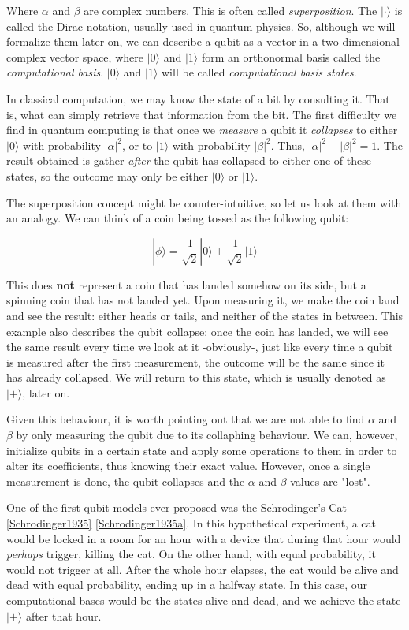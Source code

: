 Where $\alpha$ and $\beta$ are complex numbers. This is often called \emph{superposition}. The $| \cdot \rangle$ is called the Dirac notation, usually used in quantum physics. So, although we will formalize them later on, we can describe a qubit as a vector in a two-dimensional complex vector space, where $|0\rangle$ and $|1\rangle$ form an orthonormal basis called the \emph{computational basis}. $|0\rangle$ and $|1\rangle$ will be called \emph{computational basis states}.

In classical computation, we may know the state of a bit by consulting it. That is, what can simply retrieve that information from the bit. The first difficulty we find in quantum computing is that once we \emph{measure} a qubit it \emph{collapses} to either $|0\rangle$ with probability $|\alpha|^2$, or to $|1\rangle$ with probability $|\beta|^2$. Thus, $|\alpha|^2 + |\beta|^2 = 1$. The result obtained is gather \emph{after} the qubit has collapsed to either one of these states, so the outcome may only be either $|0\rangle$ or $|1\rangle$.

The superposition concept might be counter-intuitive, so let us look at them with an analogy. We can think of a coin being tossed as the following qubit:

$$ |\phi\rangle = \frac{1}{\sqrt{2}} |0\rangle + \frac{1}{\sqrt{2}} |1\rangle $$

This does \textbf{not} represent a coin that has landed somehow on its side, but a spinning coin that has not landed yet. Upon measuring it, we make the coin land and see the result: either heads or tails, and neither of the states in between. This example also describes the qubit collapse: once the coin has landed, we will see the same result every time we look at it -obviously-, just like every time a qubit is measured after the first measurement, the outcome will be the same since it has already collapsed. We will return to this state, which is usually denoted as $|+\rangle$, later on.

Given this behaviour, it is worth pointing out that we are not able to find $\alpha$ and $\beta$ by only measuring the qubit due to its collaphing behaviour. We can, however, initialize qubits in a certain state and apply some operations to them in order to alter its coefficients, thus knowing their exact value. However, once a single measurement is done, the qubit collapses and the $\alpha$ and $\beta$ values are "lost".

One of the first qubit models ever proposed was the Schrodinger's Cat \ref{Schrodinger1935} \ref{Schrodinger1935a}. In this hypothetical experiment, a cat would be locked in a room for an hour with a device that during that hour would \emph{perhaps} trigger, killing the cat. On the other hand, with equal probability, it would not trigger at all. After the whole hour elapses, the cat would be alive and dead with equal probability, ending up in a halfway state. In this case, our computational bases would be the states alive and dead, and we achieve the state $|+\rangle$ after that hour.


